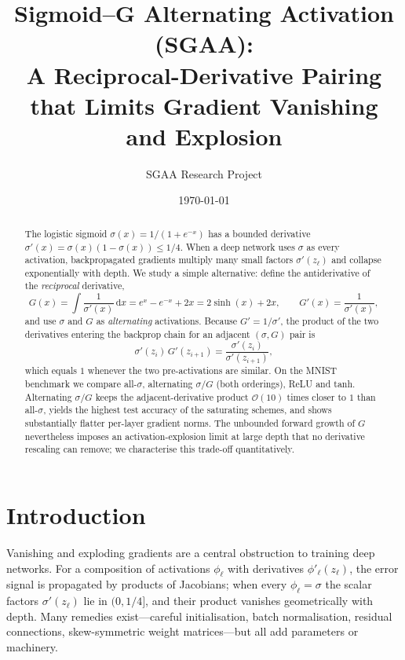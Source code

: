 \documentclass[11pt]{article}
\title{\bfseries Sigmoid--G Alternating Activation (SGAA):\\
A Reciprocal-Derivative Pairing that Limits Gradient Vanishing and Explosion}
\author{SGAA Research Project}
\date{\today}
\newcommand{\dd}{\mathrm{d}}
\begin{document}
\maketitle

\begin{abstract}
\noindent
The logistic sigmoid $\sigma(x)=1/(1+e^{-x})$ has a bounded derivative
$\sigma'(x)=\sigma(x)(1-\sigma(x))\le1/4$. When a deep network uses $\sigma$
as every activation, backpropagated gradients multiply many small factors
$\sigma'(z_\ell)$ and collapse exponentially with depth. We study a simple
alternative: define the antiderivative of the \emph{reciprocal} derivative,
\begin{equation}
  G(x)=\int \frac{1}{\sigma'(x)}\,\dd x = e^{x}-e^{-x}+2x = 2\sinh(x)+2x,
  \qquad
  G'(x)=\frac{1}{\sigma'(x)},
\end{equation}
and use $\sigma$ and $G$ as \emph{alternating} activations. Because
$G'=1/\sigma'$, the product of the two derivatives entering the backprop chain
for an adjacent $(\sigma,G)$ pair is
\begin{equation}
  \sigma'(z_i)\,G'(z_{i+1})=\frac{\sigma'(z_i)}{\sigma'(z_{i+1})},
\end{equation}
which equals $1$ whenever the two pre-activations are similar. On the MNIST
benchmark we compare all-$\sigma$, alternating $\sigma/G$ (both orderings),
ReLU and tanh. Alternating $\sigma/G$ keeps the adjacent-derivative product
$\mathcal{O}(10)$ times closer to $1$ than all-$\sigma$, yields the highest
test accuracy of the saturating schemes, and shows substantially flatter
per-layer gradient norms. The unbounded forward growth of $G$ nevertheless
imposes an activation-explosion limit at large depth that no derivative
rescaling can remove; we characterise this trade-off quantitatively.
\end{abstract}

\section{Introduction}
\label{sec:intro}
Vanishing and exploding gradients are a central obstruction to training deep
networks. For a composition of activations $\phi_\ell$ with derivatives
$\phi'_\ell(z_\ell)$, the error signal is propagated by products of Jacobians;
when every $\phi_\ell=\sigma$ the scalar factors $\sigma'(z_\ell)$ lie in
$(0,1/4]$, and their product vanishes geometrically with depth. Many remedies
exist---careful initialisation, batch normalisation, residual connections,
skew-symmetric weight matrices---but all add parameters or machinery.
\end{document}
